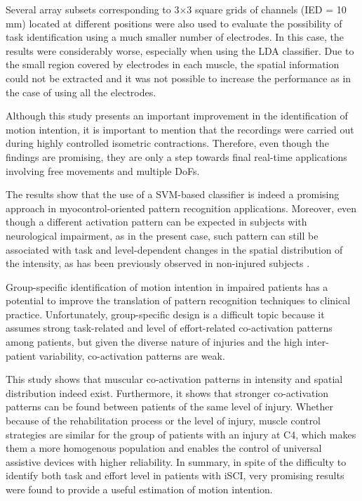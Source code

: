 Several array subsets corresponding to 3$\times$3 square grids of channels (IED = 10 mm) located at different positions were also used to evaluate the possibility of task identification using a much smaller number of electrodes. In this case, the results were considerably worse, especially when using the LDA classifier. Due to the small region covered by electrodes in each muscle, the spatial information could not be extracted and it was not possible to increase the performance as in the case of using all the electrodes.

Although this study presents an important improvement in the identification of motion intention, it is important to mention that the recordings were carried out during highly controlled isometric contractions. Therefore, even though the findings are promising, they are only a step towards final real-time applications involving free movements and multiple DoFs.

The results show that the use of a SVM-based classifier is indeed a promising approach in myocontrol-oriented pattern recognition applications. Moreover, even though a different activation pattern can be expected in subjects with neurological impairment, as in the present case, such pattern can still be associated with task and level-dependent changes in the spatial distribution of the intensity, as has been previously observed in non-injured subjects \citep{Rojas-Martinez2012}.


Group-specific identification of motion intention in impaired patients has a potential to improve the translation of pattern recognition techniques to clinical practice. Unfortunately, group-specific design is a difficult topic because it assumes strong task-related and level of effort-related co-activation patterns among patients, but given the diverse nature of injuries and the high inter-patient variability, co-activation patterns are weak.

This study shows that muscular co-activation patterns in intensity and spatial distribution indeed exist. Furthermore, it shows that stronger co-activation patterns can be found between patients of the same level of injury. Whether because of the rehabilitation process or the level of injury, muscle control strategies are similar for the group of patients with an injury at C4, which makes them a more homogenous population and enables the control of universal assistive devices with higher reliability. In summary, in spite of the difficulty to identify both task and effort level in patients with iSCI, very promising results were found to provide a useful estimation of motion intention. 


